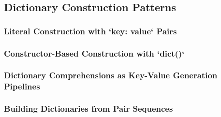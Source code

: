 \subsection{Dictionary Construction Patterns}
\subsubsection{Literal Construction with `{key: value}` Pairs}
\subsubsection{Constructor-Based Construction with `dict()`}
\subsubsection{Dictionary Comprehensions as Key-Value Generation Pipelines}
\subsubsection{Building Dictionaries from Pair Sequences}
